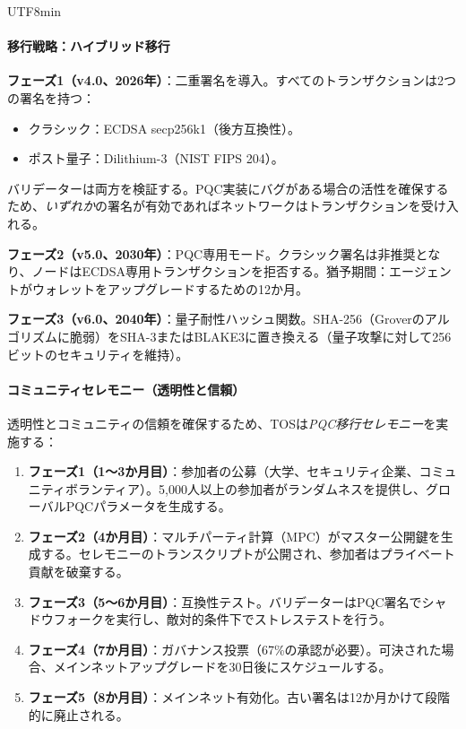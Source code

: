 \documentclass[11pt]{article}
\begin{document}
\begin{CJK}{UTF8}{min}
\paragraph{移行戦略：ハイブリッド移行}
\textbf{フェーズ1（v4.0、2026年）}：二重署名を導入。すべてのトランザクションは2つの署名を持つ：
\begin{itemize}[noitemsep]
  \item クラシック：ECDSA secp256k1（後方互換性）。
  \item ポスト量子：Dilithium-3（NIST FIPS 204）。
\end{itemize}
バリデーターは両方を検証する。PQC実装にバグがある場合の活性を確保するため、\emph{いずれか}の署名が有効であればネットワークはトランザクションを受け入れる。

\textbf{フェーズ2（v5.0、2030年）}：PQC専用モード。クラシック署名は非推奨となり、ノードはECDSA専用トランザクションを拒否する。猶予期間：エージェントがウォレットをアップグレードするための12か月。

\textbf{フェーズ3（v6.0、2040年）}：量子耐性ハッシュ関数。SHA-256（Groverのアルゴリズムに脆弱）をSHA-3またはBLAKE3に置き換える（量子攻撃に対して256ビットのセキュリティを維持）。

\paragraph{コミュニティセレモニー（透明性と信頼）}
透明性とコミュニティの信頼を確保するため、TOSは\emph{PQC移行セレモニー}を実施する：
\begin{enumerate}[noitemsep]
  \item \textbf{フェーズ1（1〜3か月目）}：参加者の公募（大学、セキュリティ企業、コミュニティボランティア）。5,000人以上の参加者がランダムネスを提供し、グローバルPQCパラメータを生成する。
  \item \textbf{フェーズ2（4か月目）}：マルチパーティ計算（MPC）がマスター公開鍵を生成する。セレモニーのトランスクリプトが公開され、参加者はプライベート貢献を破棄する。
  \item \textbf{フェーズ3（5〜6か月目）}：互換性テスト。バリデーターはPQC署名でシャドウフォークを実行し、敵対的条件下でストレステストを行う。
  \item \textbf{フェーズ4（7か月目）}：ガバナンス投票（67\%の承認が必要）。可決された場合、メインネットアップグレードを30日後にスケジュールする。
  \item \textbf{フェーズ5（8か月目）}：メインネット有効化。古い署名は12か月かけて段階的に廃止される。
\end{enumerate}


\end{CJK}
\end{document}
